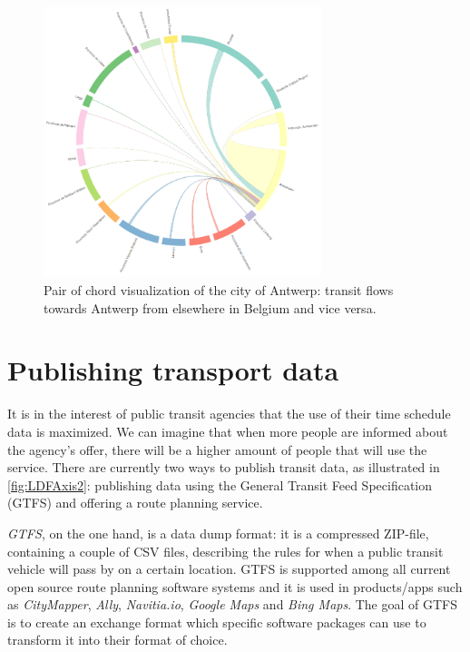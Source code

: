 \documentclass{sig-alternate}
\begin{document}
\begin{figure}
\centering
\includegraphics[width=8.1cm,align=center]{antwerp}
\caption{Pair of chord visualization of the city of Antwerp: transit flows towards Antwerp from elsewhere in Belgium and vice versa.}
\label{fig:antwerp}
\end{figure}

\section{Publishing transport data}
\label{sec:publishing}

It is in the interest of public transit agencies that the use of their time schedule data is maximized.
We can imagine that when more people are informed about the agency's offer, there will be a higher amount of people that will use the service.
There are currently two ways to publish transit data, as illustrated in \cref{fig:LDFAxis2}: publishing data using the General Transit Feed Specification (GTFS) and offering a route planning service.

\emph{GTFS}, on the one hand, is a data dump format: it is a compressed ZIP-file, containing a couple of CSV files, describing the rules for when a public transit vehicle will pass by on a certain location.
GTFS is supported among all current open source route planning software systems and it is used in products/apps such as \emph{CityMapper}, \emph{Ally}, \emph{Navitia.io}, \emph{Google Maps} and \emph{Bing Maps}.
The goal of GTFS is to create an exchange format which specific software packages can use to transform it into their format of choice.
\end{document}
